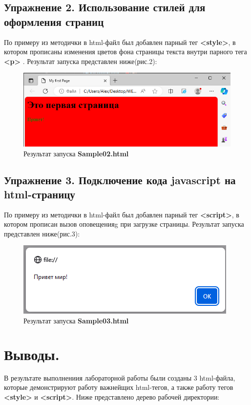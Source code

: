 \documentclass[a4paper,12pt]{article}
\begin{document}
\subsection{Упражнение 2.  Использование стилей для оформления страниц}
По примеру из методички в html-файл был добавлен парный тег \textbf{<style>}, в котором прописаны изменения цветов фона страницы  текста внутри парного тега \textbf{<p>} . Результат запуска представлен ниже(рис.2):
\begin{figure}[!h]
\begin{center}
\includegraphics[scale=0.7]{pic2.png}
\caption{Результат запуска \textbf{Sample02.html}}
\end{center}
\end{figure}

\subsection{Упражнение 3.  Подключение кода javascript на html-страницу}
По примеру из методички в html-файл был добавлен парный тег \textbf{<script>}, в котором прописан вызов оповещенияg при загрузке страницы. Результат запуска  представлен ниже(рис.3):
\begin{figure}[!h]
\begin{center}
\includegraphics[scale=1]{pic3.png}
\caption{Результат запуска \textbf{Sample03.html}}
\end{center}
\end{figure}


\section{Выводы.}

В результате выполнениия лабораторной работы были созданы 3 html-файла, которые демонстрируют работу важнейщих html-тегов, а также работу тегов  \textbf{<style>} и \textbf{<script>}. Ниже представлено дерево рабочей директории: \\
\end{document}

